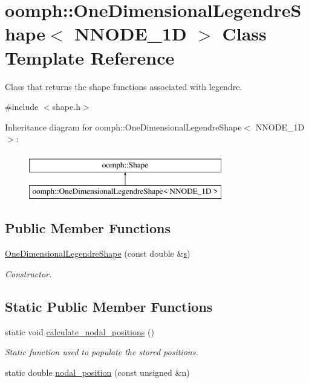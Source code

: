 \hypertarget{classoomph_1_1OneDimensionalLegendreShape}{}\section{oomph\+:\+:One\+Dimensional\+Legendre\+Shape$<$ N\+N\+O\+D\+E\+\_\+1D $>$ Class Template Reference}
\label{classoomph_1_1OneDimensionalLegendreShape}


Class that returns the shape functions associated with legendre.  




{\ttfamily \#include $<$shape.\+h$>$}

Inheritance diagram for oomph\+:\+:One\+Dimensional\+Legendre\+Shape$<$ N\+N\+O\+D\+E\+\_\+1D $>$\+:\begin{figure}[H]
\begin{center}
\leavevmode
\includegraphics[height=2.000000cm]{classoomph_1_1OneDimensionalLegendreShape}
\end{center}
\end{figure}
\subsection*{Public Member Functions}
\begin{DoxyCompactItemize}
\item 
\hyperlink{classoomph_1_1OneDimensionalLegendreShape_a33933deb41c936585bee8f844bf820e4}{One\+Dimensional\+Legendre\+Shape} (const double \&\hyperlink{cfortran_8h_ab7123126e4885ef647dd9c6e3807a21c}{s})
\begin{DoxyCompactList}\small\item\em Constructor. \end{DoxyCompactList}\end{DoxyCompactItemize}
\subsection*{Static Public Member Functions}
\begin{DoxyCompactItemize}
\item 
static void \hyperlink{classoomph_1_1OneDimensionalLegendreShape_ae33d86bf57e03bdb3dffcd248ed881cd}{calculate\+\_\+nodal\+\_\+positions} ()
\begin{DoxyCompactList}\small\item\em Static function used to populate the stored positions. \end{DoxyCompactList}\item 
static double \hyperlink{classoomph_1_1OneDimensionalLegendreShape_a5e68d68ec3373a97a96d8843b6631dba}{nodal\+\_\+position} (const unsigned \&n)
\end{DoxyCompactItemize}
